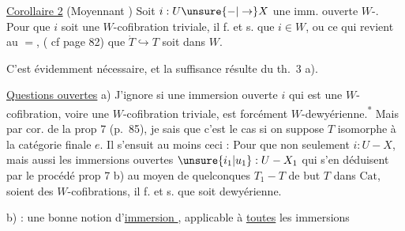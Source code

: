 \uline{Corollaire 2} (Moyennant ) Soit $i:U\unsure{-|\to}X$ une imm. ouverte $W$-. Pour que $i$ soit une $W$-cofibration triviale, il f. et s. que $i\in W$, ou ce qui revient au $=$, ( cf page 82) que $\dot T\hookrightarrow T$ soit dans $W$.

C'est évidemment nécessaire, et la suffisance résulte du th.~3 a).

\uline{Questions ouvertes} a) J'ignore si une immersion ouverte $i$ qui est une $W$-cofibration, voire une $W$-cofibration triviale, est forcément $W$-dewyérienne.\textsuperscript{*}
 Mais par  cor. de la prop 7 (p.~85), je sais que c'est le cas si on suppose $T$ isomorphe à la catégorie finale $e$. Il s'ensuit  au moins ceci : Pour que non seulement $i:U-X$, mais aussi  les immersions ouvertes $\unsure{i_1|u_1}:U-X_1$ qui s'en déduisent par le procédé  prop 7 b) au moyen de  quelconques $T_1-T$ de but $T$ dans $\mathrm{Cat}$, soient des $W$-cofibrations, il f. et s. que  soit dewyérienne.

b) :  une bonne notion d'\uline{immersion }, applicable à \uline{toutes} les immersions
